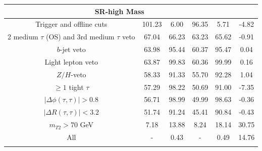 \documentclass{ws-mpla}
\begin{document}
\begin{table}[t]
{\begin{tabular}{@{}c c c c c c@{}}
%
\multicolumn{5}{c}{ \textbf{SR-high Mass} }\\\hline
Trigger and offline cuts                        &   101.23 &  6.00 &    96.35 &  5.71 &  -4.82 \\
2 medium $\tau$ (OS) and 3rd medium $\tau$ veto &    67.04 & 66.23 &    63.23 & 65.62 &  -0.91 \\
$b$-jet veto                                    &    63.98 & 95.44 &    60.37 & 95.47 &   0.04 \\
Light lepton veto                               &    63.87 & 99.83 &    60.36 & 99.99 &   0.16 \\
$Z/H$-veto                                      &    58.33 & 91.33 &    55.70 & 92.28 &   1.04 \\
$ \geq 1 $ tight $\tau$                         &    57.29 & 98.22 &    50.69 & 91.00 &  -7.35 \\
$ |\Delta\phi(\tau,\tau)| > 0.8 $               &    56.71 & 98.99 &    49.99 & 98.63 &  -0.36 \\
$ |\Delta R(\tau,\tau)| < 3.2 $                 &    51.74 & 91.24 &    45.41 & 90.84 &  -0.43 \\
$ m_{T2} > 70 $ GeV                             &     7.18 & 13.88 &     8.24 & 18.14 &  30.75 \\
All                                             &        - &  0.43 &        - &  0.49 &  14.76 \\ \botrule
\end{tabular}
\label{tab:120GeV} }
\end{table}
\end{document}
